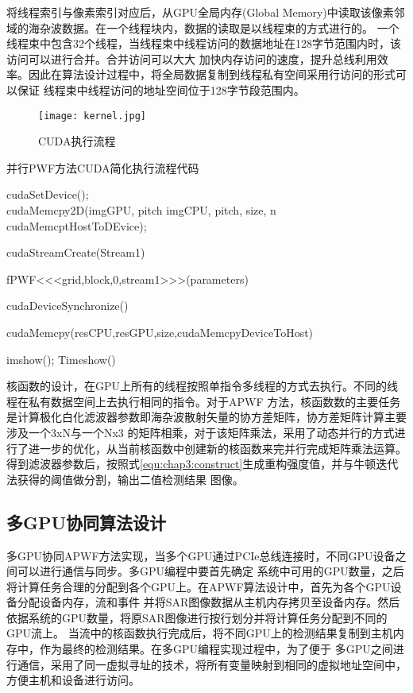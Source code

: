  将线程索引与像素索引对应后，从GPU全局内存(Global Memory)中读取该像素邻域的海杂波数据。在一个线程块内，数据的读取是以线程束的方式进行的。
 一个线程束中包含32个线程，当线程束中线程访问的数据地址在128字节范围内时，该访问可以进行合并。合并访问可以大大
 加快内存访问的速度，提升总线利用效率。因此在算法设计过程中，将全局数据复制到线程私有空间采用行访问的形式可以保证
 线程束中线程访问的地址空间位于128字节段范围内。

  \begin{figure}[H] %
    \centering
    \texttt{[image: kernel.jpg]}
    \caption{CUDA执行流程}
    \label{fig:chap3:kernel}
  \end{figure}

\begin{algorithm}[t]
  \caption{并行PWF方法CUDA简化执行流程代码}
  \label{alg:chap3:APWFCUDA}

  cudaSetDevice();\\cudaMemcpy2D(imgGPU, pitch imgCPU, pitch, size, n cudaMemcptHostToDEvice);

  cudaStreamCreate(Stream1)

  fPWF<<<grid,block,0,stream1>>>(parameters)

  cudaDeviceSynchronize()

  cudaMemcpy(resCPU,resGPU,size,cudaMemcpyDeviceToHost)

  imshow(); Timeshow()

 \end{algorithm}
 核函数的设计，在GPU上所有的线程按照单指令多线程的方式去执行。不同的线程在私有数据空间上去执行相同的指令。对于APWF
 方法，核函数数的主要任务是计算极化白化滤波器参数即海杂波散射矢量的协方差矩阵，协方差矩阵计算主要涉及一个3xN与一个Nx3
 的矩阵相乘，对于该矩阵乘法，采用了动态并行的方式进行了进一步的优化，从当前核函数中创建新的核函数来完并行完成矩阵乘法运算。
 得到滤波器参数后，按照式\ref{equ:chap3:construct}生成重构强度值，并与牛顿迭代法获得的阈值做分割，输出二值检测结果
 图像。
\subsection{多GPU协同算法设计}

 多GPU协同APWF方法实现，当多个GPU通过PCIe总线连接时，不同GPU设备之间可以进行通信与同步。多GPU编程中要首先确定
 系统中可用的GPU数量，之后将计算任务合理的分配到各个GPU上。在APWF算法设计中，首先为各个GPU设备分配设备内存，流和事件
 并将SAR图像数据从主机内存拷贝至设备内存。然后依据系统的GPU数量，将原SAR图像进行按行划分并将计算任务分配到不同的GPU流上。
 当流中的核函数执行完成后，将不同GPU上的检测结果复制到主机内存中，作为最终的检测结果。在多GPU编程实现过程中，为了便于
 多GPU之间进行通信，采用了同一虚拟寻址的技术，将所有变量映射到相同的虚拟地址空间中，方便主机和设备进行访问。

